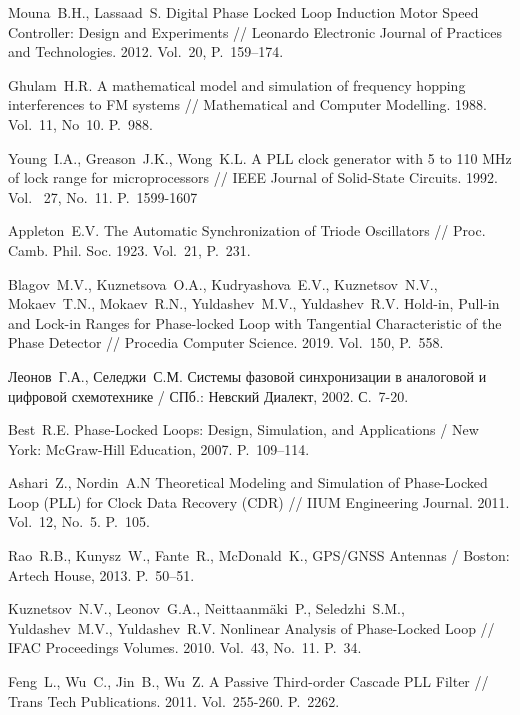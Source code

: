 \documentclass[a4paper,article,14pt]{extarticle}
\begin{document}
\pagebreak
\begin{thebibliography}{20}
 Mouna~B.\:H., Lassaad~S. Digital  Phase  Locked Loop  Induction  Motor  Speed  Controller:  Design  and  Experiments // Leonardo Electronic Journal of Practices and Technologies. 2012. Vol.~20, P.~159--174.  

 Ghulam~H.\:R. A mathematical model and simulation of frequency hopping interferences to FM systems // Mathematical and Computer Modelling. 1988. Vol.~11, No~10. P.~988.

Young~I.\:A., Greason~J.\:K., Wong~K.\:L. A PLL clock generator with 5 to 110 MHz of lock range for microprocessors //  IEEE Journal of Solid-State Circuits. 1992. Vol.~ 27, No.~11. P.~1599-1607

 Appleton~E.\:V. The Automatic Synchronization of Triode Oscillators // Proc. Camb. Phil. Soc. 1923. Vol.~21, P.~231.

 Blagov~M.\:V., Kuznetsova~O.\:A., Kudryashova~E.\:V., Kuznetsov~N.\:V., Mokaev~T.\:N., Mokaev~R.\:N., Yuldashev~M.\:V., Yuldashev~R.\:V. Hold-in, Pull-in and Lock-in Ranges for Phase-locked Loop with Tangential Characteristic of the Phase Detector // Procedia Computer Science. 2019.
Vol.~150, P.~558.

Леонов~Г.\:А., Селеджи~С.\:М. Системы фазовой синхронизации в аналоговой и цифровой схемотехнике / СПб.: Невский Диалект, 2002. С.~7-20.

  Best~R.\:E. Phase-Locked Loops: Design, Simulation, and Applications / New York: McGraw-Hill Education, 2007. P.~109--114.

Ashari~Z., Nordin~A.\:N Theoretical Modeling and Simulation of Phase-Locked Loop (PLL) for Clock Data Recovery (CDR) // IIUM Engineering Journal. 2011. Vol.~12, No.~5. P.~105.

  Rao~R.\:B., Kunysz~W., Fante~R., McDonald~K., GPS/GNSS Antennas / Boston: Artech House, 2013. P.~50--51.

Kuznetsov~N.\:V., Leonov~G.\:A., Neittaanmäki~P., Seledzhi~S.\:M., Yuldashev~M.\:V., Yuldashev~R.\:V. Nonlinear Analysis of Phase-Locked Loop // IFAC Proceedings Volumes. 2010. Vol.~43, No.~11. P.~34.

 Feng~L., Wu~C., Jin~B., Wu~Z. A Passive Third-order Cascade PLL Filter // Trans Tech Publications. 2011. Vol.~255-260. P.~2262.


\end{thebibliography}
\end{document}
